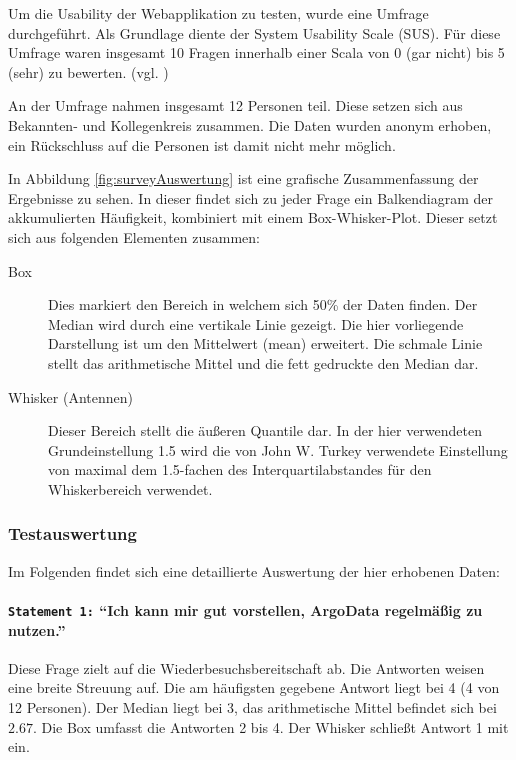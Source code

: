 Um die Usability der Webapplikation zu testen, wurde eine Umfrage durchgeführt. Als Grundlage diente der System Usability Scale (SUS).
Für diese Umfrage waren insgesamt 10 Fragen innerhalb einer Scala von 0 (gar nicht) bis 5 (sehr)  zu bewerten. (vgl. \cite{Quantita52:online})

An der Umfrage nahmen insgesamt 12 Personen teil. Diese setzen sich aus Bekannten- und Kollegenkreis zusammen. Die Daten wurden anonym erhoben, ein Rückschluss auf die Personen ist damit nicht mehr möglich.

In Abbildung \ref{fig:surveyAuswertung}
ist eine grafische Zusammenfassung der Ergebnisse zu sehen. In dieser findet sich zu jeder Frage ein Balkendiagram der akkumulierten Häufigkeit, kombiniert mit einem Box-Whisker-Plot. Dieser setzt sich aus folgenden Elementen zusammen:

\begin{description}
 \item [Box]
    Dies markiert den Bereich in welchem sich 50\% der Daten finden. Der Median wird durch eine vertikale Linie gezeigt. Die hier vorliegende Darstellung ist um den Mittelwert (mean) erweitert. Die schmale Linie stellt das arithmetische Mittel und die fett gedruckte den Median dar.
 \item [Whisker (Antennen)]
    Dieser Bereich stellt die äußeren Quantile dar. In der hier verwendeten Grundeinstellung 1.5 wird die von John W. Turkey verwendete Einstellung von maximal dem 1.5-fachen des Interquartilabstandes für den Whiskerbereich verwendet.
\end{description}


\subsubsection{Testauswertung}

Im Folgenden findet sich eine detaillierte Auswertung der hier erhobenen Daten:


\paragraph{\texttt{Statement 1:} "`Ich kann mir gut vorstellen, ArgoData regelmäßig zu nutzen."'}
    Diese Frage zielt auf die Wiederbesuchsbereitschaft ab. Die Antworten weisen eine breite Streuung auf. Die am häufigsten gegebene Antwort liegt bei 4 (4 von 12 Personen). Der Median liegt bei 3, das arithmetische Mittel befindet sich bei $2.67$. Die Box umfasst die Antworten 2 bis 4. Der Whisker schließt Antwort 1 mit ein.

